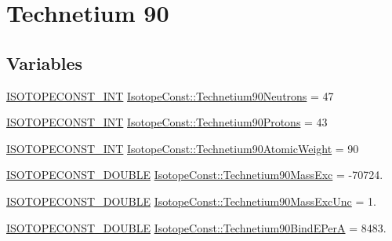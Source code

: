 \hypertarget{group___isotope_const-_technetium-_tc90}{}\section{Technetium 90}
\label{group___isotope_const-_technetium-_tc90}
\subsection*{Variables}
\begin{DoxyCompactItemize}
\item 
\mbox{\hyperlink{group___isotope_const-_macros_ga5f18360b3e99483a35c32d789e62621c}{I\+S\+O\+T\+O\+P\+E\+C\+O\+N\+S\+T\+\_\+\+I\+NT}} \mbox{\hyperlink{group___isotope_const-_technetium-_tc90_gaa1c8a8d3eb57d61208c835062fc98b45}{Isotope\+Const\+::\+Technetium90\+Neutrons}} = 47
\item 
\mbox{\hyperlink{group___isotope_const-_macros_ga5f18360b3e99483a35c32d789e62621c}{I\+S\+O\+T\+O\+P\+E\+C\+O\+N\+S\+T\+\_\+\+I\+NT}} \mbox{\hyperlink{group___isotope_const-_technetium-_tc90_ga8322acf9a7c5869951b5f93e4c804bc0}{Isotope\+Const\+::\+Technetium90\+Protons}} = 43
\item 
\mbox{\hyperlink{group___isotope_const-_macros_ga5f18360b3e99483a35c32d789e62621c}{I\+S\+O\+T\+O\+P\+E\+C\+O\+N\+S\+T\+\_\+\+I\+NT}} \mbox{\hyperlink{group___isotope_const-_technetium-_tc90_ga2565b2201db2ebb36afb4bbcd70959c4}{Isotope\+Const\+::\+Technetium90\+Atomic\+Weight}} = 90
\item 
\mbox{\hyperlink{group___isotope_const-_macros_ga8f45a7272ce02c0b4c65c44636ed719a}{I\+S\+O\+T\+O\+P\+E\+C\+O\+N\+S\+T\+\_\+\+D\+O\+U\+B\+LE}} \mbox{\hyperlink{group___isotope_const-_technetium-_tc90_ga79bf0ef889bb0beea4508871403d49ad}{Isotope\+Const\+::\+Technetium90\+Mass\+Exc}} = -\/70724.
\item 
\mbox{\hyperlink{group___isotope_const-_macros_ga8f45a7272ce02c0b4c65c44636ed719a}{I\+S\+O\+T\+O\+P\+E\+C\+O\+N\+S\+T\+\_\+\+D\+O\+U\+B\+LE}} \mbox{\hyperlink{group___isotope_const-_technetium-_tc90_ga272bb37a4660fc685567cc53f2aa1d79}{Isotope\+Const\+::\+Technetium90\+Mass\+Exc\+Unc}} = 1.
\item 
\mbox{\hyperlink{group___isotope_const-_macros_ga8f45a7272ce02c0b4c65c44636ed719a}{I\+S\+O\+T\+O\+P\+E\+C\+O\+N\+S\+T\+\_\+\+D\+O\+U\+B\+LE}} \mbox{\hyperlink{group___isotope_const-_technetium-_tc90_ga079be68333310d7f466645eb29b10a20}{Isotope\+Const\+::\+Technetium90\+Bind\+E\+PerA}} = 8483.
\item 

\end{DoxyCompactItemize}
